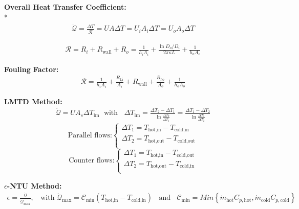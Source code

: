 \begin{datasheet}
\pagebreak[0]

{\bf Overall Heat Transfer Coefficient:}\\*
\begin{align*}
  \dot{\mathcal{Q}} =  \frac{\Delta T}{\mathcal{R}} = U A \Delta T  = U_{i}A_{i}\Delta T = U_{o}A_{o}\Delta T
\end{align*}

\begin{align*}
  \mathcal{R} = R_{i} + R_{\text{wall}} + R_{o} = \frac{1}{h_{i}A_{i}} + \frac{\ln{D_{o}/D_{i}}}{2\pi \kappa L} + \frac{1}{h_{o}A_{o}} 
\end{align*}

{\bf Fouling Factor:}
\begin{align*}
   \mathcal{R} = \frac{1}{h_{i}A_{i}} + \frac{R_{\text{f,i}}}{A_{i}} + R_{\text{wall}} + \frac{R_{\text{f,o}}}{A_{o}} + \frac{1}{h_{o}A_{o}}
\end{align*}

{\bf LMTD Method:}
\begin{align*}
        \dot{\mathcal{Q}} = U A_{s} \Delta T_{\text{lm}}\;\text{ with }\;\;\Delta T_{\text{lm}} = \frac{\Delta T_{2} - \Delta T_{1}}{\ln{\frac{\Delta T_{2}}{\Delta T_{1}}}} = \frac{\Delta T_{1} - \Delta T_{2}}{\ln{\frac{\Delta T_{1}}{\Delta T_{2}}}}
\end{align*}
\begin{displaymath}
   \text{Parallel flows:}
   \begin{cases}
      \Delta T_{1} = T_{\text{hot,in}}-T_{\text{cold,in}} \\
      \Delta T_{2} = T_{\text{hot,out}}-T_{\text{cold,out}} \\
   \end{cases}
\end{displaymath}
\begin{displaymath}
   \text{Counter flows:}
   \begin{cases}
      \Delta T_{1} = T_{\text{hot,in}}-T_{\text{cold,out}} \\
      \Delta T_{2} = T_{\text{hot,out}}-T_{\text{cold,in}} \\
   \end{cases}
\end{displaymath}


{\bf $\epsilon$-NTU Method:}
\begin{align*}
   \epsilon = \frac{\dot{\mathcal{Q}}}{\dot{\mathcal{Q}}_{\text{max}}},\;\;\text{ with } \dot{\mathcal{Q}}_{\text{max}} = \mathcal{C}_{\text{min}}\left(T_{\text{hot,in}}-T_{\text{cold,in}}\right)\;\;\text{ and }\;\;\mathcal{C}_{\text{min}} = Min\left\{\dot{m}_{\text{hot}}C_{p,\text{hot}}, \dot{m}_{\text{cold}}C_{p,\text{cold}}\right\}
\end{align*}



\end{datasheet}
